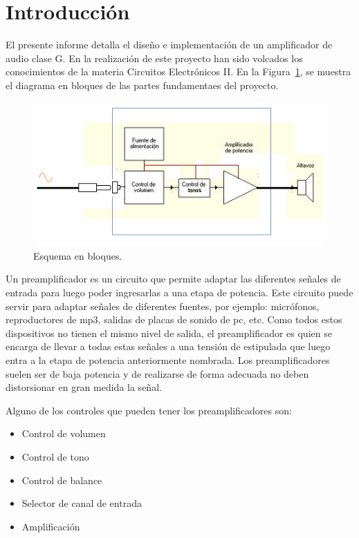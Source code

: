 \section{Introducción}
\bigskip

El presente informe detalla el diseño e implementación de un amplificador de audio clase G. En la realización de este proyecto han sido volcados los conocimientos de la materia Circuitos Electrónicos II. En la Figura~\ref{esquema_bloques}, se muestra el diagrama en bloques de las partes fundamentaes del proyecto.
	
	\begin{figure}[H]
	\centering
	\includegraphics[scale=0.65]{img/esquema_bloques.png}
	\caption{Esquema en bloques.}
	\label{esquema_bloques} 
	\end{figure}
	
	
Un preamplificador es un circuito que permite adaptar las diferentes señales de entrada para luego poder ingresarlas a una etapa de potencia. Este circuito puede servir para adaptar señales de diferentes fuentes, por ejemplo: micrófonos, reproductores de mp3, salidas de placas de sonido de  pc, etc. Como todos estos dispositivos no tienen el mismo nivel de salida, el preamplificador es quien se encarga de llevar a todas estas señales a una tensión de estipulada que luego entra a la etapa de potencia anteriormente nombrada. Los preamplificadores suelen ser de baja potencia y de realizarse de forma adecuada no deben distorsionar en gran medida la señal.

Alguno de los controles que pueden tener los preamplificadores son:
	
\begin{itemize}
	\item Control de volumen
	\item Control de tono
	\item Control de balance
	\item Selector de canal de entrada 
	\item Amplificación
	\end{itemize}	
	
